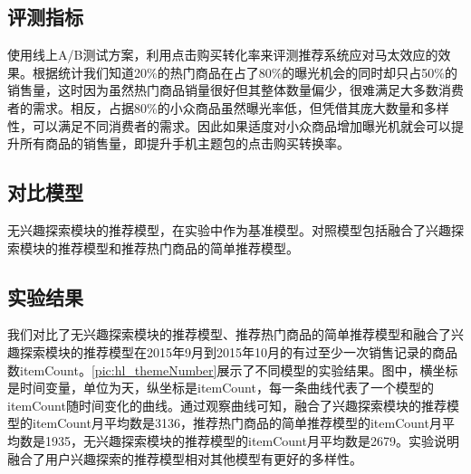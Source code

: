   \subsection{评测指标}
  使用线上A/B测试方案，利用点击购买转化率来评测推荐系统应对马太效应的效果\citep{matthew-effect}。根据统计我们知道20\%的热门商品在占了80\%的曝光机会的同时却只占50\%的销售量，这时因为虽然热门商品销量很好但其整体数量偏少，很难满足大多数消费者的需求。相反，占据80\%的小众商品虽然曝光率低，但凭借其庞大数量和多样性，可以满足不同消费者的需求。因此如果适度对小众商品增加曝光机就会可以提升所有商品的销售量，即提升手机主题包的点击购买转换率。
  \subsection{对比模型}
  无兴趣探索模块的推荐模型，在实验中作为基准模型。对照模型包括融合了兴趣探索模块的推荐模型和推荐热门商品的简单推荐模型。
  \subsection{实验结果}
  我们对比了无兴趣探索模块的推荐模型、推荐热门商品的简单推荐模型和融合了兴趣探索模块的推荐模型在2015年9月到2015年10月的有过至少一次销售记录的商品数itemCount。\autoref{pic:hl_themeNumber}展示了不同模型的实验结果。图中，横坐标是时间变量，单位为天，纵坐标是itemCount，每一条曲线代表了一个模型的itemCount随时间变化的曲线。通过观察曲线可知，融合了兴趣探索模块的推荐模型的itemCount月平均数是3136，推荐热门商品的简单推荐模型的itemCount月平均数是1935，无兴趣探索模块的推荐模型的itemCount月平均数是2679。实验说明融合了用户兴趣探索的推荐模型相对其他模型有更好的多样性。
  \begin{figure}
  \centering
    \label{pic:hl_themeNumber}
  \end{figure}

